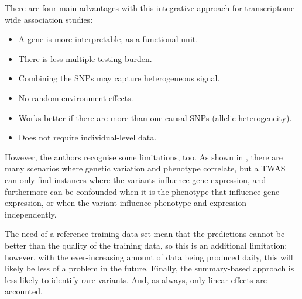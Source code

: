 \documentclass[../main.tex]{subfiles}
\begin{document}
There are four main advantages with this integrative approach for 
transcriptome-wide association studies:

\begin{itemize}
	\item A gene is more interpretable, as a functional unit.
	\item There is less multiple-testing burden.
	\item Combining the SNPs may capture heterogeneous signal.
	\item No random environment effects.
	\item Works better if there are more than one causal SNPs (allelic 
heterogeneity).
	\item Does not require individual-level data.
\end{itemize}

However, the authors recognise some limitations, too. As shown in 
, there are many scenarios where genetic variation 
and phenotype correlate, but a TWAS can only find instances where the 
variants influence gene expression, and furthermore can be confounded 
when it is the phenotype that influence gene expression, or when the 
variant influence phenotype and expression independently.

The need of a reference training data set mean that the predictions 
cannot be better than the quality of the training data, so this is an 
additional limitation; however, with the ever-increasing amount of data 
being produced daily, this will likely be less of a problem in the 
future. Finally, the summary-based approach is less likely to identify 
rare variants. And, as always, only linear effects are accounted.
\end{document}

